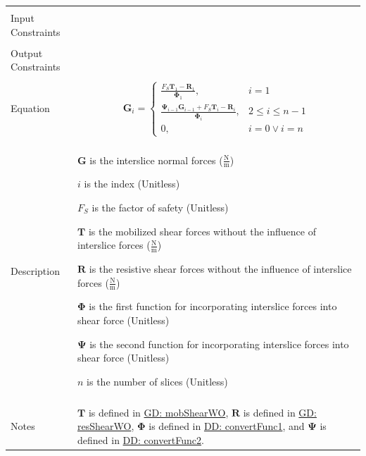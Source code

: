 \documentclass[12pt]{article}
\begin{document}
\begin{minipage}{\textwidth}
\begin{tabular}{>{\raggedright}p{}>{\raggedright\arraybackslash}p{}}
\\ \midrule \\
Input Constraints & 
\\ \midrule \\
Output Constraints & 
\\ \midrule \\
Equation & \begin{displaymath}
           {\mathbf{G}}_{i}=\begin{cases}
                            \frac{{F_{S}} {\mathbf{T}}_{1}-{\mathbf{R}}_{1}}{{\mathbf{Φ}}_{1}}, & i=1\\
\frac{{\mathbf{Ψ}}_{i-1} {\mathbf{G}}_{i-1}+{F_{S}} {\mathbf{T}}_{i}-{\mathbf{R}}_{i}}{{\mathbf{Φ}}_{i}}, & 2\leq{}i\leq{}n-1\\
0, & i=0\lor{}i=n
                            \end{cases}
           \end{displaymath}
\\ \midrule \\
Description & \begin{symbDescription}
              \item{$\mathbf{G}$ is the interslice normal forces ($\frac{\text{N}}{\text{m}}$)}
              \item{$i$ is the index (Unitless)}
              \item{${F_{S}}$ is the factor of safety (Unitless)}
              \item{$\mathbf{T}$ is the mobilized shear forces without the influence of interslice forces ($\frac{\text{N}}{\text{m}}$)}
              \item{$\mathbf{R}$ is the resistive shear forces without the influence of interslice forces ($\frac{\text{N}}{\text{m}}$)}
              \item{$\mathbf{Φ}$ is the first function for incorporating interslice forces into shear force (Unitless)}
              \item{$\mathbf{Ψ}$ is the second function for incorporating interslice forces into shear force (Unitless)}
              \item{$n$ is the number of slices (Unitless)}
              \end{symbDescription}
\\ \midrule \\
Notes & $\mathbf{T}$ is defined in \hyperref[GD:mobShearWO]{GD: mobShearWO}, $\mathbf{R}$ is defined in \hyperref[GD:resShearWO]{GD: resShearWO}, $\mathbf{Φ}$ is defined in \hyperref[DD:convertFunc1]{DD: convertFunc1}, and $\mathbf{Ψ}$ is defined in \hyperref[DD:convertFunc2]{DD: convertFunc2}.
        

\end{tabular}
\end{minipage}
\end{document}
